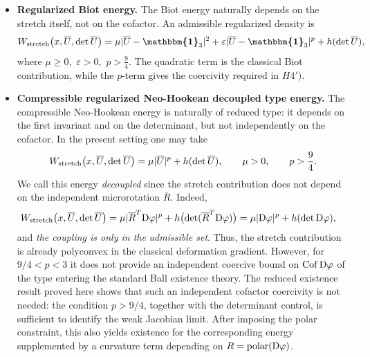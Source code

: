 \documentclass[11pt]{article}
\newcommand{\id}{{\boldsymbol{\mathbbm{1}}}}
\DeclareMathOperator{\Cof}{Cof}
\begin{document}
\begin{itemize}

\item \textbf{Regularized Biot energy.}
The Biot energy naturally depends on the stretch itself, not on the cofactor.
An admissible regularized density is
\begin{align}
        W_{\rm stretch}\bigl(x,\overline U,\det \overline U\bigr)
        =
        \mu  | \overline U-\id_3 | ^2
        +
        \varepsilon | \overline U-\id_3 | ^p
        +
        h(\det \overline U),
\end{align}
where
$
        \mu\geq0,
             $ $
        \varepsilon>0,
            $ $
        p>\frac{9}{4}. 
$
The quadratic term is the classical Biot contribution, while the $p$-term gives
the coercivity required in $H4')$.

\item \textbf{Compressible regularized Neo-Hookean decoupled type energy.}
The compressible Neo-Hookean energy is naturally of reduced type: it depends on
the first invariant and on the determinant, but not independently on the
cofactor. In the present setting one may take
\begin{align}
        W_{\rm stretch}\bigl(x,\overline U,\det \overline U\bigr)
        =
        \mu |\overline U|^p
        +
        h(\det \overline U),
        \qquad
        \mu>0,
        \qquad
        p>\frac{9}{4}.
\end{align}
We call this energy \emph{decoupled} since the stretch contribution does not
depend on the independent microrotation $\overline R$. Indeed,
\begin{align}
        W_{\rm stretch}\bigl(x,\overline U,\det \overline U\bigr)
        &=
        \mu |\overline R^T{\rm D}\varphi|^p
        +
        h\bigl(\det(\overline R^T{\rm D}\varphi)\bigr)
        =
        \mu |{\rm D}\varphi|^p
        +
        h(\det{\rm D}\varphi),
\end{align}
and {\it the coupling is only in the admissible set}.
Thus, the stretch contribution is already polyconvex in the classical
deformation gradient. However, for $9/4<p<3$ it does not provide an
independent coercive bound on $\Cof{\rm D}\varphi$ of the type entering the
standard Ball existence theory. The reduced existence result proved here
shows that such an independent cofactor coercivity is not needed: the
condition $p>9/4$, together with the determinant control, is sufficient to
identify the weak Jacobian limit. After imposing the polar constraint, this
also yields existence for the corresponding energy supplemented by a
curvature term depending on
$R=\operatorname{polar}({\rm D}\varphi)$.



\end{itemize}
\end{document}

